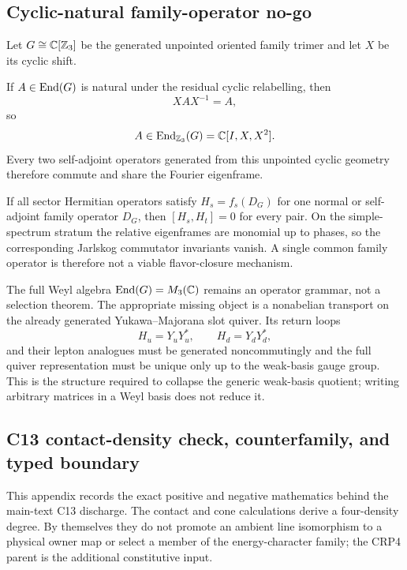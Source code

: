 \documentclass[11pt,a4paper]{article}
\begin{document}
\subsection{Cyclic-natural family-operator no-go}
\label{p6:sec:family-quiver-update}

Let $G\cong\mathbb{C}[\mathbb Z_3]$ be the generated unpointed oriented family
trimer and let $X$ be its cyclic shift.

\begin{theorem}
\label{p6:thm:cyclic-natural-family-circulant}
If $A\in\operatorname{End}(G)$ is natural under the residual cyclic relabelling, then
\[
 XAX^{-1}=A,
\]
so
\[
 A\in\operatorname{End}_{\mathbb Z_3}(G)=\mathbb{C}[I,X,X^2].
\]
Every two self-adjoint operators generated from this unpointed cyclic geometry
therefore commute and share the Fourier eigenframe.
\end{theorem}

\begin{corollary}
\label{p6:cor:no-single-family-dirac-mixing}
If all sector Hermitian operators satisfy $H_s=f_s(D_G)$ for one normal or
self-adjoint family operator $D_G$, then $[H_s,H_t]=0$ for every pair.  On the
simple-spectrum stratum the relative eigenframes are monomial up to phases,
so the corresponding Jarlskog commutator invariants vanish.  A single common
family operator is therefore not a viable flavor-closure mechanism.
\end{corollary}

The full Weyl algebra $\operatorname{End}(G)=M_3(\mathbb{C})$ remains an operator grammar, not a
selection theorem.  The appropriate missing object is a nonabelian transport
on the already generated Yukawa--Majorana slot quiver.  Its return loops
\[
 H_u=Y_uY_u^*,\qquad H_d=Y_dY_d^*,
\]
and their lepton analogues must be generated noncommutingly and the full
quiver representation must be unique only up to the weak-basis gauge group.
This is the structure required to collapse the generic weak-basis quotient;
writing arbitrary matrices in a Weyl basis does not reduce it.

\subsection{C13 contact-density check, counterfamily, and typed boundary}
\label{p6:app:c13-density-and-counterfamily}

This appendix records the exact positive and negative mathematics behind the
main-text C13 discharge.  The contact and cone calculations derive a
four-density degree.  By themselves they do not promote an ambient line
isomorphism to a physical owner map or select a member of the
energy-character family; the CRP4 parent is the additional constitutive input.
\end{document}
